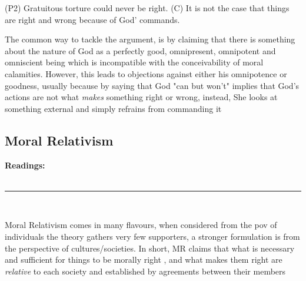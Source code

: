 \documentclass[english,course]{Notes}
\newcommand{\ita}[1]{\textit{#1}}
\newcommand\readings{\textbf{Readings:} \\}
\newcommand\sep{\\ \noindent\rule{10cm}{0.8pt} \\}
\begin{document}
{{
{(P2) Gratuitous torture could never be right.}
{(C) It is not the case that things are right and wrong because of God' 
commands.}

\par{The common way to tackle the argument, is by claiming that there is something about the nature of God as a perfectly good, omnipresent, omnipotent and omniscient being which is incompatible with the conceivability of moral calamities. However, this leads to objections against either his omnipotence or goodness, usually because by saying that God "can but won't" implies that God's actions are not what \ita{makes} something right or wrong, instead, She looks at something external and simply refrains from commanding it}




\newpage
\subsection{Moral Relativism}
\readings \cite[Chapter 1]{driver_2014} 
\sep

\par{Moral Relativism comes in many flavours, when considered from the pov of individuals the theory gathers very few supporters, a stronger formulation is from the perspective of cultures/societies. In short, MR claims that what is necessary and sufficient for things to be morally right , and what makes them right are \ita{relative} to each society and established by agreements between their members}

}}
\end{document}
